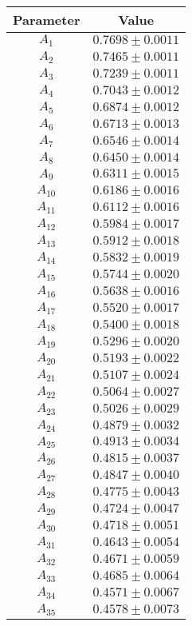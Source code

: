 \begin{tabular}{c|c}
Parameter & Value\\
\hline
$A_{1}$ & $0.7698\pm0.0011$ \\
$A_{2}$ & $0.7465\pm0.0011$ \\
$A_{3}$ & $0.7239\pm0.0011$ \\
$A_{4}$ & $0.7043\pm0.0012$ \\
$A_{5}$ & $0.6874\pm0.0012$ \\
$A_{6}$ & $0.6713\pm0.0013$ \\
$A_{7}$ & $0.6546\pm0.0014$ \\
$A_{8}$ & $0.6450\pm0.0014$ \\
$A_{9}$ & $0.6311\pm0.0015$ \\
$A_{10}$ & $0.6186\pm0.0016$ \\
$A_{11}$ & $0.6112\pm0.0016$ \\
$A_{12}$ & $0.5984\pm0.0017$ \\
$A_{13}$ & $0.5912\pm0.0018$ \\
$A_{14}$ & $0.5832\pm0.0019$ \\
$A_{15}$ & $0.5744\pm0.0020$ \\
$A_{16}$ & $0.5638\pm0.0016$ \\
$A_{17}$ & $0.5520\pm0.0017$ \\
$A_{18}$ & $0.5400\pm0.0018$ \\
$A_{19}$ & $0.5296\pm0.0020$ \\
$A_{20}$ & $0.5193\pm0.0022$ \\
$A_{21}$ & $0.5107\pm0.0024$ \\
$A_{22}$ & $0.5064\pm0.0027$ \\
$A_{23}$ & $0.5026\pm0.0029$ \\
$A_{24}$ & $0.4879\pm0.0032$ \\
$A_{25}$ & $0.4913\pm0.0034$ \\
$A_{26}$ & $0.4815\pm0.0037$ \\
$A_{27}$ & $0.4847\pm0.0040$ \\
$A_{28}$ & $0.4775\pm0.0043$ \\
$A_{29}$ & $0.4724\pm0.0047$ \\
$A_{30}$ & $0.4718\pm0.0051$ \\
$A_{31}$ & $0.4643\pm0.0054$ \\
$A_{32}$ & $0.4671\pm0.0059$ \\
$A_{33}$ & $0.4685\pm0.0064$ \\
$A_{34}$ & $0.4571\pm0.0067$ \\
$A_{35}$ & $0.4578\pm0.0073$ \\

\end{tabular}
